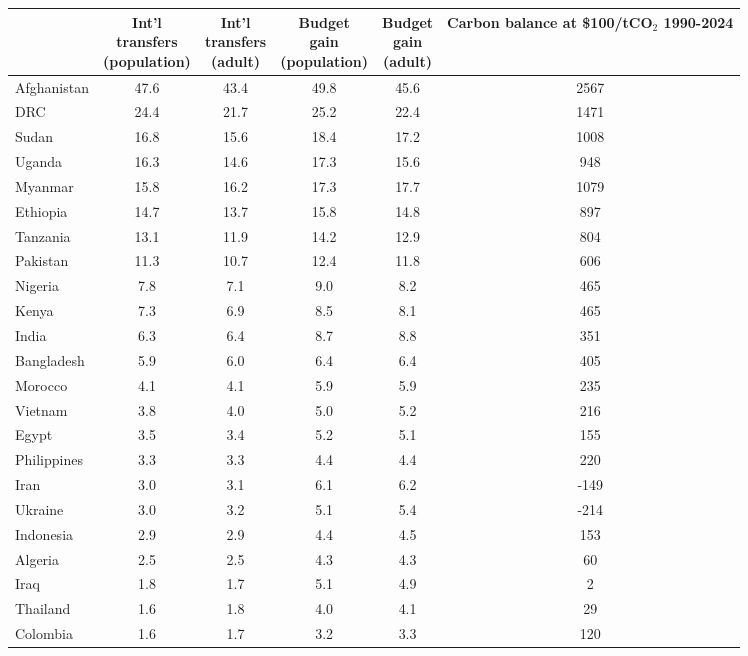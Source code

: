 
\begin{tabular}[t]{lccccc}
\toprule
  & \makecell{Int'l\\transfers\\(population)} & \makecell{Int'l\\transfers\\(adult)} & \makecell{Budget\\gain\\(population)} & \makecell{Budget\\gain\\(adult)} & \makecell{Carbon balance\\at \$100/tCO$_\text{2}$\\1990-2024}\\
\midrule
Afghanistan & 47.6 & 43.4 & 49.8 & 45.6 & 2567\\
DRC & 24.4 & 21.7 & 25.2 & 22.4 & 1471\\
Sudan & 16.8 & 15.6 & 18.4 & 17.2 & 1008\\
Uganda & 16.3 & 14.6 & 17.3 & 15.6 & 948\\
Myanmar & 15.8 & 16.2 & 17.3 & 17.7 & 1079\\
Ethiopia & 14.7 & 13.7 & 15.8 & 14.8 & 897\\
Tanzania & 13.1 & 11.9 & 14.2 & 12.9 & 804\\
Pakistan & 11.3 & 10.7 & 12.4 & 11.8 & 606\\
Nigeria & 7.8 & 7.1 & 9.0 & 8.2 & 465\\
Kenya & 7.3 & 6.9 & 8.5 & 8.1 & 465\\
India & 6.3 & 6.4 & 8.7 & 8.8 & 351\\
Bangladesh & 5.9 & 6.0 & 6.4 & 6.4 & 405\\
Morocco & 4.1 & 4.1 & 5.9 & 5.9 & 235\\
Vietnam & 3.8 & 4.0 & 5.0 & 5.2 & 216\\
Egypt & 3.5 & 3.4 & 5.2 & 5.1 & 155\\
Philippines & 3.3 & 3.3 & 4.4 & 4.4 & 220\\
Iran & 3.0 & 3.1 & 6.1 & 6.2 & -149\\
Ukraine & 3.0 & 3.2 & 5.1 & 5.4 & -214\\
Indonesia & 2.9 & 2.9 & 4.4 & 4.5 & 153\\
Algeria & 2.5 & 2.5 & 4.3 & 4.3 & 60\\
Iraq & 1.8 & 1.7 & 5.1 & 4.9 & 2\\
Thailand & 1.6 & 1.8 & 4.0 & 4.1 & 29\\
Colombia & 1.6 & 1.7 & 3.2 & 3.3 & 120\\

\end{tabular}
